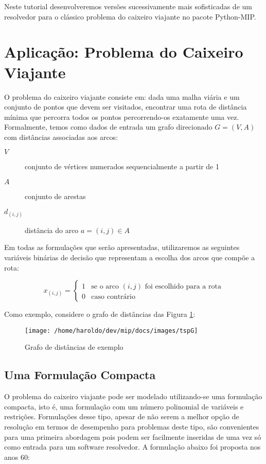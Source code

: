 \documentclass[a4paper,11pt,fleqn]{article}
\begin{document}
Neste tutorial desenvolveremos versões sucessivamente mais sofisticadas
de um resolvedor para o clássico problema do caixeiro viajante no
pacote Python-MIP.

\section{Aplicação: Problema do Caixeiro Viajante}

O problema do caixeiro viajante consiste em: dada uma malha viária
e um conjunto de pontos que devem ser visitados, encontrar uma rota
de distância mínima que percorra todos os pontos percorrendo-os exatamente
uma vez. Formalmente, temos como dados de entrada um grafo direcionado
$G=(V,A)$ com distâncias associadas aos arcos:
\begin{description}
	\item [{$V$}] conjunto de vértices numerados sequencialmente a partir
	de 1
	\item [{$A$}] conjunto de arestas
	\item [{$d_{(i,j)}$}] distância do arco $a=(i,j)\in A$
\end{description}
Em todas as formulações que serão apresentadas, utilizaremos as seguintes
variáveis binárias de decisão que representam a escolha dos arcos
que compõe a rota:

\[
x_{(i,j)}=\begin{cases}
1 & \textrm{se o arco }(i,j)\textrm{ foi escolhido para a rota}\\
0 & \textrm{caso contrário}
\end{cases}
\]

Como exemplo, considere o grafo de distâncias das Figura \ref{figG}:

\begin{figure}
	\begin{centering}
		\texttt{[image: /home/haroldo/dev/mip/docs/images/tspG]}
		\par\end{centering}
	\caption{Grafo de distâncias de exemplo}
	
	\label{figG}
\end{figure}


\subsection{Uma Formulação Compacta}

O problema do caixeiro viajante pode ser modelado utilizando-se uma
formulação compacta, isto é, uma formulação com um número polinomial
de variáveis e restrições. Formulações desse tipo, apesar de não serem
a melhor opção de resolução em termos de desempenho para problemas
deste tipo, são convenientes para uma primeira abordagem pois podem
ser facilmente inseridas de uma vez só como entrada para um software
resolvedor. A formulação abaixo foi proposta\cite{Miller1960} nos
anos 60:
\end{document}
